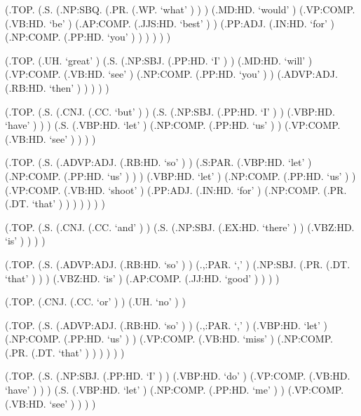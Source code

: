 \documentclass[10pt]{article}
\begin{document}
\begin{parsetree}  (.TOP. (.S. (.NP:SBQ. (.PR. (.WP. `what' ) ) ) (.MD:HD. `would' ) (.VP:COMP. (.VB:HD. `be' ) (.AP:COMP. (.JJS:HD. `best' ) ) (.PP:ADJ. (.IN:HD. `for' ) (.NP:COMP. (.PP:HD. `you' ) ) ) ) ) ) \end{parsetree}

\begin{parsetree}  (.TOP. (.UH. `great' ) (.S. (.NP:SBJ. (.PP:HD. `I' ) ) (.MD:HD. `will' ) (.VP:COMP. (.VB:HD. `see' ) (.NP:COMP. (.PP:HD. `you' ) ) (.ADVP:ADJ. (.RB:HD. `then' ) ) ) ) ) \end{parsetree}

\begin{parsetree}  (.TOP. (.S. (.CNJ. (.CC. `but' ) ) (.S. (.NP:SBJ. (.PP:HD. `I' ) ) (.VBP:HD. `have' ) ) ) (.S. (.VBP:HD. `let' ) (.NP:COMP. (.PP:HD. `us' ) ) (.VP:COMP. (.VB:HD. `see' ) ) ) ) \end{parsetree}

\begin{parsetree}  (.TOP. (.S. (.ADVP:ADJ. (.RB:HD. `so' ) ) (.S:PAR. (.VBP:HD. `let' ) (.NP:COMP. (.PP:HD. `us' ) ) ) (.VBP:HD. `let' ) (.NP:COMP. (.PP:HD. `us' ) ) (.VP:COMP. (.VB:HD. `shoot' ) (.PP:ADJ. (.IN:HD. `for' ) (.NP:COMP. (.PR. (.DT. `that' ) ) ) ) ) ) ) \end{parsetree}

\begin{parsetree}  (.TOP. (.S. (.CNJ. (.CC. `and' ) ) (.S. (.NP:SBJ. (.EX:HD. `there' ) ) (.VBZ:HD. `is' ) ) ) ) \end{parsetree}

\begin{parsetree}  (.TOP. (.S. (.ADVP:ADJ. (.RB:HD. `so' ) ) (.,:PAR. `,' ) (.NP:SBJ. (.PR. (.DT. `that' ) ) ) (.VBZ:HD. `is' ) (.AP:COMP. (.JJ:HD. `good' ) ) ) ) \end{parsetree}

\begin{parsetree}  (.TOP. (.CNJ. (.CC. `or' ) ) (.UH. `no' ) ) \end{parsetree}

\begin{parsetree}  (.TOP. (.S. (.ADVP:ADJ. (.RB:HD. `so' ) ) (.,:PAR. `,' ) (.VBP:HD. `let' ) (.NP:COMP. (.PP:HD. `us' ) ) (.VP:COMP. (.VB:HD. `miss' ) (.NP:COMP. (.PR. (.DT. `that' ) ) ) ) ) ) \end{parsetree}

\begin{parsetree}  (.TOP. (.S. (.NP:SBJ. (.PP:HD. `I' ) ) (.VBP:HD. `do' ) (.VP:COMP. (.VB:HD. `have' ) ) ) (.S. (.VBP:HD. `let' ) (.NP:COMP. (.PP:HD. `me' ) ) (.VP:COMP. (.VB:HD. `see' ) ) ) ) \end{parsetree}
\end{document}

